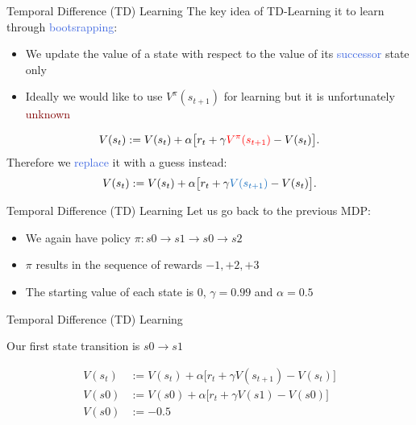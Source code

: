 \documentclass{beamer}
\begin{document}
\begin{frame}{Temporal Difference (TD) Learning}
	The key idea of TD-Learning it to learn through \textcolor{RoyalBlue}{bootsrapping}:
	\begin{itemize}
		\item We update the value of a state with respect to the value of its \textcolor{RoyalBlue}{successor} state only
		\item Ideally we would like to use $V^{\pi}(s_{t+1})$ for learning but it is unfortunately \textcolor{Maroon}{unknown}
	\end{itemize}
	\begin{align*}
		V(s_t):= V(s_t) + \alpha \big[r_t + \gamma \textcolor{red}{V^{\pi}(s_{t+1})} - V(s_t)\big].
	\end{align*}
	Therefore we \textcolor{RoyalBlue}{replace} it with a guess instead:
	\begin{align*}
		V(s_t):= V(s_t) + \alpha \big[r_t + \gamma \textcolor{RoyalBlue}{V(s_{t+1})} - V(s_t)\big].
	\end{align*}
	
\end{frame}

\begin{frame}{Temporal Difference (TD) Learning}
	Let us go back to the previous MDP:
	\begin{center}
	
	\end{center}

	\begin{itemize}
		\item We again have policy $\pi: s0\rightarrow s1 \rightarrow s0 \rightarrow s2$
		\item $\pi$ results in the sequence of rewards $-1, +2, +3$
		\item The starting value of each state is $0$, $\gamma=0.99$ and $\alpha=0.5$
	\end{itemize}
	
\end{frame}


\begin{frame}{Temporal Difference (TD) Learning}
	\begin{center}
	
	\end{center}

	Our first state transition is $s0 \rightarrow s1$

	\begin{align*}
		V(s_t) & := V(s_t) + \alpha \big[r_t + \gamma V(s_{t+1}) - V(s_t)\big] \\
		V(s0) & := V(s0) + \alpha \big[r_t + \gamma V(s1) - V(s0)\big] \\ 
		V(s0) & := -0.5
	\end{align*}

\end{frame}
\end{document}

